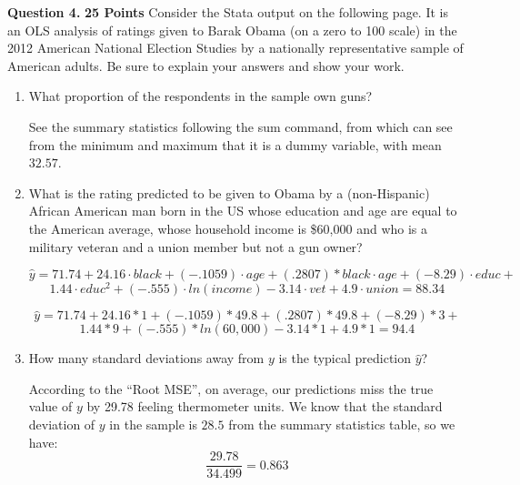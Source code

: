 \documentclass[12pt]{article}
\begin{document}
\vspace{4mm} 
\textbf{Question 4.} \textbf{25 Points} Consider the Stata output on the following page. It is an OLS analysis of ratings given to Barak Obama (on a zero to 100 scale) in the 2012 American National Election Studies by a nationally representative sample of American adults. Be sure to explain your answers and show your work.
    \begin{enumerate}
    \item What proportion of the respondents in the sample own guns?
        
 \vspace{4mm}
 
See the summary statistics following the \textsf{sum} command, from which can see from the minimum and maximum that it is a dummy variable, with mean $32.57$.

 \item What is the rating predicted to be given to Obama by a (non-Hispanic) African American man born in the US whose education and age are equal to the American average, whose household income is \$60,000 and who is a military veteran and a union member but not a gun owner?

 \[
 \hat{y} = 71.74 + 24.16\cdot black +(-.1059)\cdot age  +  (.2807)*black\cdot age + (-8.29)\cdot educ + {}
 \]
 \[
  1.44\cdot educ^2 + (-.555)\cdot ln(income) -3.14\cdot vet + 4.9\cdot union = 88.34
 \]
 
 \[
  \hat{y} = 71.74 + 24.16*1 +(-.1059)*  49.8  +  (.2807)* 49.8 + (-8.29)*3 + {}
 \]
 \[
  1.44* 9 + (-.555)* ln(60,000) -3.14*1 + 4.9*1 =  94.4
 \]
\normalsize

 \item How many standard deviations away from $y$ is the typical prediction $\hat{y}$?
 
 \vspace{4mm}
 
 According to the ``Root MSE'', on average, our predictions miss the true value of $y$ by 29.78 feeling thermometer units. We know that the standard deviation of $y$ in the sample is $28.5$ from the summary statistics table, so we have:
 \[
 \frac{29.78}{34.499} = 0.863
 \]

\vspace{5mm}


\end{enumerate}
\end{document}
